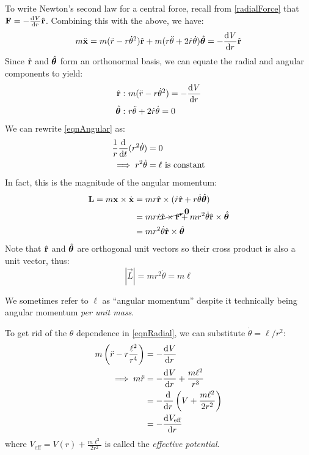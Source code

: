 \documentclass[../main.tex]{subfiles}
\begin{document}
To write Newton's second law for a central force, recall from \cref{radialForce} that $\vec{F} = -\deriv{V}{r}\uvec{r}$.
Combining this with the above, we have:
\[
  m\ddot{\vec{x}} = m(\ddot{r} - r \dot{\theta}^2)\uvec{r} + m(r \ddot{\theta}  + 2\dot{r} \dot{\theta}) \uvec{\theta} = -\deriv{V}{r}\uvec{r}
\]
Since $\hat{\mathbf{\bm{r}}}$ and $\hat{\mathbf{\bm{\theta}}}$ form an orthonormal basis, we can equate the radial and angular components to yield:
\begin{align}
  \uvec{r}:&\ m(\ddot{r} - r \dot{\theta}^2) = -\deriv{V}{r} \label{eqnRadial} \\
  \uvec{\theta}:&\ r\ddot{\theta}  + 2\dot{r}\dot{\theta} = 0 \label{eqnAngular}
\end{align}
We can rewrite \cref{eqnAngular} as:
\begin{align}
  \frac{1}{r}\deriv{}{t}(r^2 \dot{\theta}) &= 0 \nonumber \\
  \implies r^2 \dot{\theta} &= \ell \text{ is constant} \label{rthetadot}
\end{align}
In fact, this is the magnitude of the angular momentum:
\begin{align*}
  \mathbf{\bm{L}} = m \mathbf{\bm{x}} \times \dot{\mathbf{\bm{x}}} &= m r \hat{\mathbf{\bm{r}}} \times(\dot{r} \hat{\mathbf{\bm{r}}} + r \dot{\theta}\hat{\mathbf{\bm{\theta}}}) \\
                                           &= m r \dot{r} \cancelto{\mathbf{\bm{0}}}{\hat{\mathbf{\bm{r}}} \times \hat{\mathbf{\bm{r}}}} + mr^2 \dot{\theta} \hat{\mathbf{\bm{r}}} \times \hat{\mathbf{\bm{\theta}}} \\
                                           &= mr^2 \dot{\theta} \hat{\mathbf{\bm{r}}} \times \hat{\mathbf{\bm{\theta}}}
\end{align*}
Note that $\hat{\mathbf{\bm{r}}}$ and $\hat{\mathbf{\bm{\theta}}}$ are orthogonal unit vectors so their cross product is also a unit vector, thus:
\[
  |\vec{L}| = m r^2 \dot{\theta} = m \ell
\]
\begin{remark}
  We sometimes refer to $\ell$ as ``angular momentum'' despite it technically being angular momentum \textit{per unit mass}.
\end{remark}

To get rid of the $\theta$ dependence in \cref{eqnRadial}, we can substitute $\dot{\theta} = \ell/r^2$:
\begin{align*}
  m\left(\ddot{r} - r\frac{\ell^2}{r^4}\right) &= -\deriv{V}{r} \\
  \implies m\ddot{r} &= - \deriv{V}{r} + \frac{m\ell^2}{r^3} \\
            &= -\deriv{}{r}\left(V + \frac{m\ell^2}{2r^2}\right) \\
            &= -\deriv{V_{\text{eff}}}{r}
\end{align*}
where $V_{\text{eff}} = V(r) + \frac{m\ell^2}{2r^2}$ is called the \textit{effective potential}.
\end{document}
